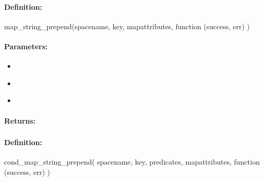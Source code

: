 \paragraph{Definition:}
\begin{javascriptcode}
map_string_prepend(spacename, key, mapattributes, function (success, err) {})
\end{javascriptcode}
\paragraph{Parameters:}
\begin{itemize}[noitemsep]
\item {}\\

\item {}\\

\item {}\\

\end{itemize}

\paragraph{Returns:}


\pagebreak
\subsubsection{}
\label{api:nodejs:cond_map_string_prepend}


\paragraph{Definition:}
\begin{javascriptcode}
cond_map_string_prepend(
        spacename, key, predicates, mapattributes, function (success, err) {})
\end{javascriptcode}
